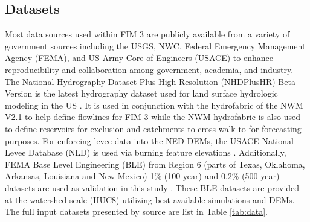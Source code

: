 \subsection{Datasets}
\label{ssec:datasets}
%
Most data sources used within FIM 3 are publicly available from a variety of government sources including the USGS, NWC, Federal Emergency Management Agency (FEMA), and US Army Core of Engineers (USACE) to enhance reproducibility and collaboration among government, academia, and industry.
The National Hydrography Dataset Plus High Resolution (NHDPlusHR) Beta Version is the latest hydrography dataset used for land surface hydrologic modeling in the US \cite{moore2019user}. 
It is used in conjunction with the hydrofabric of the NWM V2.1 to help define flowlines for FIM 3 while the NWM hydrofabric is also used to define reservoirs for exclusion and catchments to cross-walk to for forecasting purposes.
For enforcing levee data into the NED DEMs, the USACE National Levee Database (NLD) is used via burning feature elevations \cite{engineers2016national}.
Additionally, FEMA Base Level Engineering (BLE) from Region 6 (parts of Texas, Oklahoma, Arkansas, Louisiana and New Mexico) 1\% (100 year) and 0.2\% (500 year) datasets are used as validation in this study \cite{fema2021base,fema2021estimated}. 
These BLE datasets are provided at the watershed scale (HUC8) utilizing best available simulations and DEMs.
The full input datasets presented by source are list in Table \ref{tab:data}.
%

